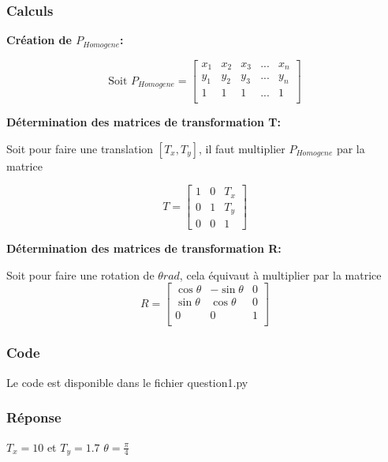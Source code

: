 \documentclass[12pt]{article}
\begin{document}
\subsubsection{Calculs}
\textbf{Création de $P_{Homogene}$:}

\[ \text{Soit } P_{Homogene} =
\begin{bmatrix}
    x_1 & x_2 & x_3 & ... & x_n \\
    y_1 & y_2 & y_3 & ... & y_n \\
    1   & 1   & 1   & ... & 1   \\
\end{bmatrix}
\]

\textbf{D\'etermination des matrices de transformation T:}

Soit pour faire une translation $[T_x, T_y]$, il faut multiplier $P_{Homogene}$ par la matrice

\[
    T =
    \begin{bmatrix}
        1 & 0 & T_{x} \\
        0 & 1 & T_{y} \\
        0 & 0 & 1
    \end{bmatrix}
    \]

\textbf{D\'etermination des matrices de transformation R:}

Soit pour faire une rotation de $\theta rad$, cela \'equivaut \`a multiplier par la matrice
\[
    R =
    \begin{bmatrix}
        \cos{\theta} & -\sin{\theta} & 0 \\
        \sin{\theta} & \cos{\theta} & 0 \\
        0 & 0 & 1 \\
    \end{bmatrix}
    \]

\subsubsection{Code}

Le code est disponible dans le fichier question1.py

\subsubsection{Réponse}

$T_x = 10$ et $T_y = 1.7$
$\theta = \frac{\pi}{4}$
\end{document}

